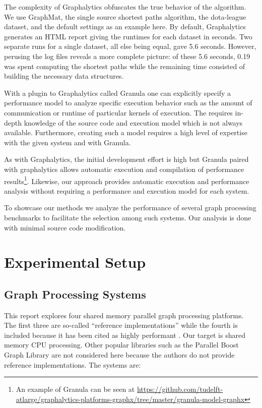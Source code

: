 \documentclass{llncs}
\begin{document}
The complexity of Graphalytics obfuscates the true behavior of the algorithm. We use GraphMat, the single source shortest paths algorithm, the dota-league dataset, and the default settings as an example here. By default, Graphalytics generates an HTML report giving the runtimes for each dataset in seconds. Two separate runs for a single dataset, all else being equal, gave 5.6 seconds. However, perusing the log files reveals a more complete picture: of these 5.6 seconds, 0.19 was spent computing the shortest paths while the remaining time consisted of building the necessary data structures.

With a plugin to Graphalytics called Granula \cite{Ngai:2015:Granula} one can explicitly specify a performance model to analyze specific execution behavior such as the amount of communication or runtime of particular kernels of execution. The requires in-depth knowledge of the source code and execution model which is not always available. Furthermore, creating such a model requires a high level of expertise with the given system and with Granula.

As with Graphalytics, the initial development effort is high but Granula paired with graphalytics allows automatic execution and compilation of performance results\footnote{An example of Granula can be seen at \url{https://github.com/tudelft-atlarge/graphalytics-platforms-graphx/tree/master/granula-model-graphx}}. Likewise, our approach provides automatic execution and performance analysis without requiring a performance and execution model for each system.

To showcase our methods we analyze the performance of several graph processing benchmarks to facilitate the selection among such systems. Our analysis is done with minimal source code modification.

\section{Experimental Setup}

\subsection{Graph Processing Systems}

This report explores four shared memory parallel graph processing platforms. The first three are so-called ``reference implementations'' while the fourth is included because it has been cited as highly performant \cite{Sundaram:2015:GraphMat}. Our target is shared memory CPU processing. Other popular libraries such as the Parallel Boost Graph Library \cite{Gregor:2005:PBGL} are not considered here because the authors do not provide reference implementations. The systems are:
\end{document}
